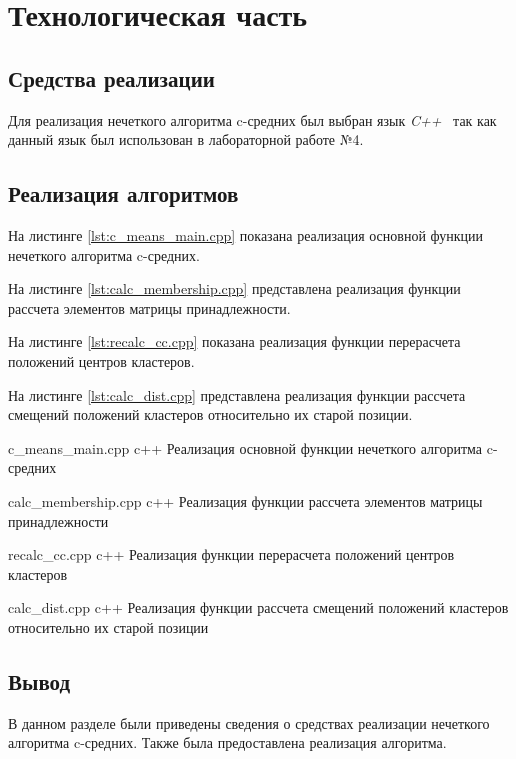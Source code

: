 \chapter{Технологическая часть}

\section{Средства реализации}

Для реализация нечеткого алгоритма c-средних был выбран язык \textit{C++}~\cite{cpp-lang} так как данный язык был использован в лабораторной работе №4.

\section{Реализация алгоритмов}

На листинге \ref{lst:c_means_main.cpp} показана реализация основной функции нечеткого алгоритма c-средних.

На листинге \ref{lst:calc_membership.cpp} представлена реализация функции рассчета элементов матрицы принадлежности.

На листинге \ref{lst:recalc_cc.cpp} показана реализация функции перерасчета положений центров кластеров.

На листинге \ref{lst:calc_dist.cpp} представлена реализация функции рассчета смещений положений кластеров относительно их старой позиции.

	{c_means_main.cpp}
	{c++}
	{Реализация основной функции нечеткого алгоритма c-средних}
	
	{calc_membership.cpp}
	{c++}
	{Реализация функции рассчета элементов матрицы принадлежности}
	
	{recalc_cc.cpp}
	{c++}
	{Реализация функции перерасчета положений центров кластеров}
	
	{calc_dist.cpp}
	{c++}
	{Реализация функции рассчета смещений положений кластеров относительно их старой позиции}

\section*{Вывод}
В данном разделе были приведены сведения о средствах реализации нечеткого алгоритма c-средних.
Также была предоставлена реализация алгоритма.